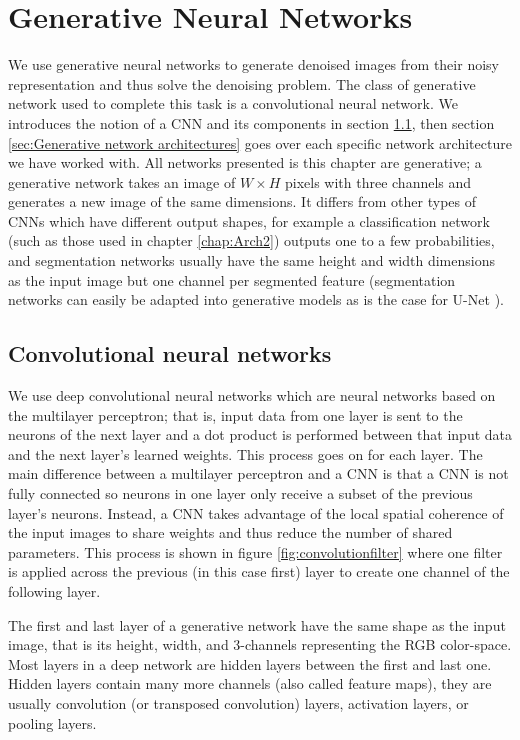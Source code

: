 \chapter{Generative Neural Networks}\label{chap:Arch1}
We use generative neural networks to generate denoised images from their noisy representation and thus solve the denoising problem. The class of generative network used to complete this task is a convolutional neural network. We introduces the notion of a \acl{CNN} and its components in section \ref{sec:Convolutional neural networks}, then section \ref{sec:Generative network architectures} goes over each specific network architecture we have worked with. All networks presented is this chapter are generative; a generative network takes an image of $W\times H$ pixels with three channels and generates a new image of the same dimensions. It differs from other types of \aclp{CNN} which have different output shapes, for example a classification network (such as those used in chapter \ref{chap:Arch2}) outputs one to a few probabilities, and segmentation networks usually have the same height and width dimensions as the input image but one channel per segmented feature (segmentation networks can easily be adapted into generative models as is the case for U-Net \cite{unet}). 

\section{Convolutional neural networks}\label{sec:Convolutional neural networks}

We use deep convolutional neural networks which are neural networks based on the multilayer perceptron; that is, input data from one layer is sent to the neurons of the next layer and a dot product is performed between that input data and the next layer's learned weights. This process goes on for each layer. The main difference between a multilayer perceptron and a \ac{CNN} is that a \ac{CNN} is not fully connected so neurons in one layer only receive a subset of the previous layer's neurons. Instead, a \ac{CNN} takes advantage of the local spatial coherence of the input images to share weights and thus reduce the number of shared parameters. This process is shown in figure \ref{fig:convolutionfilter} where one filter is applied across the previous (in this case first) layer to create one channel of the following layer.

The first and last layer of a generative network have the same shape as the input image, that is its height, width, and 3-channels representing the RGB color-space. Most layers in a deep network are hidden layers between the first and last one. Hidden layers contain many more channels (also called feature maps), they are usually convolution (or transposed convolution) layers, activation layers, or pooling layers.


